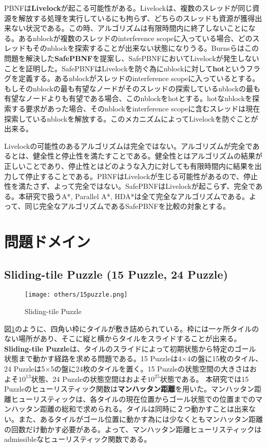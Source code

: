 \documentclass[uplatex]{jsarticle}
\begin{document}
PBNFは\textbf{Livelock}が起こる可能性がある。Livelockは、複数のスレッドが同じ資源を解放する処理を実行しているにも拘らず、どちらのスレッドも資源が獲得出来ない状況である。この時、アルゴリズムは有限時間内に終了しないことになる。あるnblockが複数のスレッドのinterference scopeに入っている場合、どのスレッドもそのnblockを探索することが出来ない状態になりうる。Burnsらはこの問題を解決した\textbf{SafePBNF}を提案し、SafePBNFにおいてLivelockが発生しないことを証明した。SafePBNFはLivelockを防ぐ為にnblockに対して\textbf{hot}というフラグを定義する。あるnblockがスレッドのinterference scopeに入っているとする。もしそのnblockの最も有望なノードがそのスレッドの探索しているnblockの最も有望なノードよりも有望である場合、このnblockをhotとする。hotなnblockを探索する要求があった場合、そのnblockをinterference scopeに含むスレッドは現在探索しているnblockを解放する。このメカニズムによってLivelockを防ぐことが出来る。

Livelockの可能性のあるアルゴリズムは完全ではない。アルゴリズムが完全であるとは、健全性と停止性を満たすことである。健全性とはアルゴリズムの結果が正しいことであり、停止性とはどのような入力に対しても有限時間内に結果を出力して停止することである。PBNFはLivelockが生じる可能性があるので、停止性を満たさず、よって完全ではない。SafePBNFはLivelockが起こらず、完全である。本研究で扱うA*, Parallel A*, HDA*は全て完全なアルゴリズムである。よって、同じ完全なアルゴリズムであるSafePBNFを比較の対象とする。


\newpage

\section{問題ドメイン}
\label{sec:domain}

\subsection{Sliding-tile Puzzle (15 Puzzle, 24 Puzzle)}

\begin{figure}[h]
	\centering
	\texttt{[image: others/15puzzle.png]}
	\caption{Sliding-tile Puzzle}
	\label{fig:15puzzle}
\end{figure}%
図\ref{fig:15puzzle}のように、四角い枠にタイルが敷き詰められている。枠には一ヶ所タイルのない場所があり、そこに縦と横からタイルをスライドすることが出来る。\textbf{Sliding-tile Puzzle}は、タイルのスライドによって初期状態から特定のゴール状態まで動かす経路を求める問題である。15 Puzzleは4$\times$4の盤に15枚のタイル、24 Puzzleは5$\times$5の盤に24枚のタイルを置く。15 Puzzleの状態空間の大きさはおよそ$10^{13}$状態、24 Puzzleの状態空間はおよそ$10^{25}$状態である。 本研究では15 Puzzleのヒューリスティック関数は\textbf{マンハッタン距離}を用いた。マンハッタン距離ヒューリスティックは、各タイルの現在位置からゴール状態での位置までのマンハッタン距離の総和で求められる。タイルは同時に２つ動かすことは出来ない。また、あるタイルがゴール位置に動かす為には少なくともマンハッタン距離の回数だけ動かす必要がある。よって、マンハッタン距離ヒューリスティックはadmissibleなヒューリスティック関数である。
\end{document}
